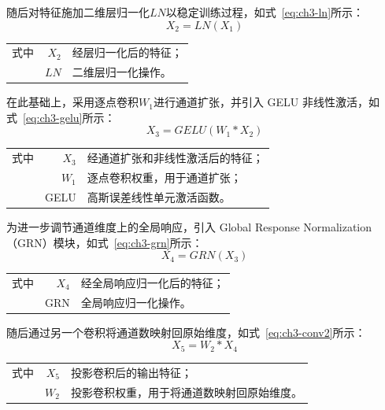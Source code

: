 随后对特征施加二维层归一化$LN$以稳定训练过程，如式~\eqref{eq:ch3-ln}所示：
\begin{equation}\label{eq:ch3-ln}
X_2=LN(X_1)
\end{equation}
\begin{tabularx}{\textwidth}{@{}l@{\quad}r@{———}X@{}}
式中& $X_2$ & 经层归一化后的特征；\\
& $LN$ & 二维层归一化操作。\\
\end{tabularx}\vspace{3.15bp}

在此基础上，采用逐点卷积$W_1$进行通道扩张，并引入 GELU 非线性激活，如式~\eqref{eq:ch3-gelu}所示：
\begin{equation}\label{eq:ch3-gelu}
X_3=GELU(W_1*X_2)
\end{equation}
\begin{tabularx}{\textwidth}{@{}l@{\quad}r@{———}X@{}}
式中& $X_3$ & 经通道扩张和非线性激活后的特征；\\
& $W_1$ & 逐点卷积权重，用于通道扩张；\\
& GELU & 高斯误差线性单元激活函数。\\
\end{tabularx}\vspace{3.15bp}

为进一步调节通道维度上的全局响应，引入 Global Response Normalization（GRN）模块，如式~\eqref{eq:ch3-grn}所示：
\begin{equation}\label{eq:ch3-grn}
X_4=GRN(X_3)
\end{equation}
\begin{tabularx}{\textwidth}{@{}l@{\quad}r@{———}X@{}}
式中& $X_4$ & 经全局响应归一化后的特征；\\
& GRN & 全局响应归一化操作。\\
\end{tabularx}\vspace{3.15bp}

随后通过另一个卷积将通道数映射回原始维度，如式~\eqref{eq:ch3-conv2}所示：
\begin{equation}\label{eq:ch3-conv2}
X_5=W_2*X_4
\end{equation}
\begin{tabularx}{\textwidth}{@{}l@{\quad}r@{———}X@{}}
式中& $X_5$ & 投影卷积后的输出特征；\\
& $W_2$ & 投影卷积权重，用于将通道数映射回原始维度。\\
\end{tabularx}\vspace{3.15bp}

